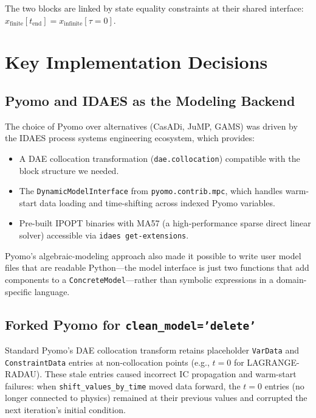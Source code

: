 \documentclass[11pt,letterpaper]{article}
\begin{document}
The two blocks are linked by state equality constraints at their shared interface: $x_{\text{finite}}[t_\text{end}] = x_{\text{infinite}}[\tau=0]$.

\section{Key Implementation Decisions}

\subsection{Pyomo and IDAES as the Modeling Backend}

The choice of Pyomo over alternatives (CasADi, JuMP, GAMS) was driven by the IDAES process systems engineering ecosystem, which provides:
\begin{itemize}[leftmargin=2em]
  \item A DAE collocation transformation (\texttt{dae.collocation}) compatible with the block structure we needed.
  \item The \texttt{DynamicModelInterface} from \texttt{pyomo.contrib.mpc}, which handles warm-start data loading and time-shifting across indexed Pyomo variables.
  \item Pre-built IPOPT binaries with MA57 (a high-performance sparse direct linear solver) accessible via \texttt{idaes get-extensions}.
\end{itemize}

Pyomo's algebraic-modeling approach also made it possible to write user model files that are readable Python---the model interface is just two functions that add components to a \texttt{ConcreteModel}---rather than symbolic expressions in a domain-specific language.

\subsection{Forked Pyomo for \texttt{clean\_model='delete'}}

Standard Pyomo's DAE collocation transform retains placeholder \texttt{VarData} and \texttt{ConstraintData} entries at non-collocation points (e.g., $t=0$ for LAGRANGE-RADAU). These stale entries caused incorrect IC propagation and warm-start failures: when \texttt{shift\_values\_by\_time} moved data forward, the $t=0$ entries (no longer connected to physics) remained at their previous values and corrupted the next iteration's initial condition.
\end{document}
